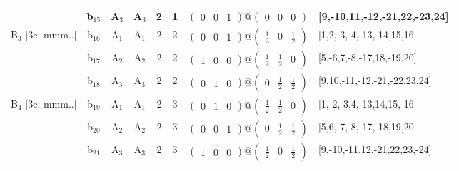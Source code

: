 \documentclass[fleqn,10pt,landscape]{article}
\begin{document}
\begin{itemize}
\begin{center}
\begin{longtable}{cc|cc|c|c|c|l}
& b$_{15}$ & A$_{3}$ & A$_{3}$ & 2 & 1 & $\begin{pmatrix} 0 & 0 & 1 \end{pmatrix}@\begin{pmatrix} 0 & 0 & 0 \end{pmatrix}$ & [9,-10,11,-12,-21,22,-23,24] \\ \hline
B$_{3}$ [3c: mmm..] & b$_{16}$ & A$_{1}$ & A$_{1}$ & 2 & 2 & $\begin{pmatrix} 0 & 0 & 1 \end{pmatrix}@\begin{pmatrix} \frac{1}{2} & 0 & \frac{1}{2} \end{pmatrix}$ & [1,2,-3,-4,-13,-14,15,16] \\
& b$_{17}$ & A$_{2}$ & A$_{2}$ & 2 & 2 & $\begin{pmatrix} 1 & 0 & 0 \end{pmatrix}@\begin{pmatrix} \frac{1}{2} & \frac{1}{2} & 0 \end{pmatrix}$ & [5,-6,7,-8,-17,18,-19,20] \\
& b$_{18}$ & A$_{3}$ & A$_{3}$ & 2 & 2 & $\begin{pmatrix} 0 & 1 & 0 \end{pmatrix}@\begin{pmatrix} 0 & \frac{1}{2} & \frac{1}{2} \end{pmatrix}$ & [9,10,-11,-12,-21,-22,23,24] \\ \hline
B$_{4}$ [3c: mmm..] & b$_{19}$ & A$_{1}$ & A$_{1}$ & 2 & 3 & $\begin{pmatrix} 0 & 1 & 0 \end{pmatrix}@\begin{pmatrix} \frac{1}{2} & \frac{1}{2} & 0 \end{pmatrix}$ & [1,-2,-3,4,-13,14,15,-16] \\
& b$_{20}$ & A$_{2}$ & A$_{2}$ & 2 & 3 & $\begin{pmatrix} 0 & 0 & 1 \end{pmatrix}@\begin{pmatrix} 0 & \frac{1}{2} & \frac{1}{2} \end{pmatrix}$ & [5,6,-7,-8,-17,-18,19,20] \\
& b$_{21}$ & A$_{3}$ & A$_{3}$ & 2 & 3 & $\begin{pmatrix} 1 & 0 & 0 \end{pmatrix}@\begin{pmatrix} \frac{1}{2} & 0 & \frac{1}{2} \end{pmatrix}$ & [9,-10,-11,12,-21,22,23,-24] \\
\end{longtable}
\end{center}


\end{itemize}
\end{document}
